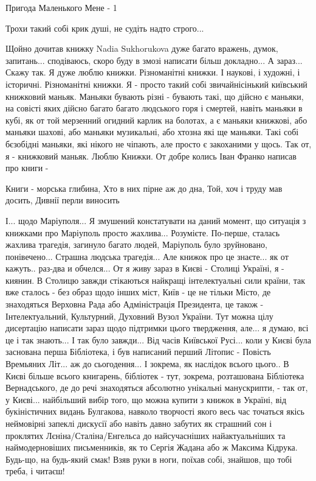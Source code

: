 Пригода Маленького Мене - 1

Трохи такий собі крик душі, не судіть надто строго...

Щойно дочитав книжку Nadia Sukhorukova дуже багато вражень, думок, запитань... сподіваюсь, скоро буду в змозі написати більш докладно... А зараз... Скажу так. Я дуже люблю книжки. Різноманітні книжки. І наукові, і художні, і історичні. Різноманітні книжки. Я - просто такий собі звичайнісінький київський книжковий маньяк. Маньяки бувають різні - бувають такі, що дійсно є маньяки, на совісті яких дійсно багато багато людського горя і смертей, навіть маньяки в кубі, як от той мерзенний огидний карлик на болотах,  а є маньяки книжкові, або маньяки шахові, або маньяки музикальні, або хтозна які ще маньяки. Такі собі бєзобідні маньяки, які нікого не чіпають, але просто є закоханими у щось. Так от, я - книжковий маньяк. Люблю Книжки. От добре колись Іван Франко написав про книги - 

Книги - морська глибина, 
Хто в них пірне аж до дна, 
Той, хоч і труду мав досить, 
Дивнії перли виносить 

І... щодо Маріуполя... Я змушений констатувати на даний момент, що ситуація з книжками про Маріуполь просто жахлива... Розумієте. По-перше, сталась жахлива трагедія, загинуло багато людей, Маріуполь було зруйновано, понівечено... Страшна людська трагедія... Але книжок про це знаєте... як от кажуть.. раз-два и обчелся... От я живу зараз в Києві - Столиці Україні, я - киянин. В Столицю завжди стікаються найкращі інтелектуальні сили країни, так вже сталось - без образ щодо інших міст, Київ - це не тільки Місто, де знаходяться Верховна Рада або Адміністрація Президента, це також - Інтелектуальний, Культурний, Духовний Вузол України. Тут можна цілу дисертацію написати зараз щодо підтримки цього твердження, але... я думаю, всі це і так знають... І так було завжди... Від часів Київської Русі... коли у Києві була заснована перша Бібліотека, і був написаний перший Літопис - Повість Времьяних Літ... аж до сьогодення... І зокрема, як наслідок всього цього.. В Києві більше всього книгарень, бібліотек - тут, зокрема, розташована Бібліотека Вернадського, де до речі знаходяться абсолютно унікальні манускрипти, -  так от, у Києві... найбільший вибір того, що можна купити з книжок в Україні, від букіністичних видань Булгакова, навколо творчості якого весь час точаться якісь неймовірні запеклі дискусії або навіть давно забутих як страшний сон і проклятих Лєніна/Сталіна/Енгельса до найсучасніших найактуальніших та наймодерновіших письменників, як то Сергія Жадана або ж Максима Кідрука. Будь-що, на будь-який смак! Взяв руки в ноги, поїхав собі, знайшов, що тобі треба, і читаєш!

